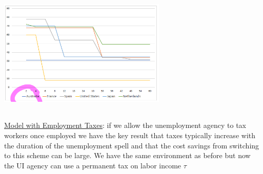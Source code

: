 \documentclass{article}
\begin{document}
\begin{itemize}
    \begin{center}
        \includegraphics[width=8cm, height=6cm]{pic27}
    \end{center}
\end{itemize}
\vspace{2.5mm}
\par \underline{Model with Employment Taxes}: if we allow the unemployment agency to tax workers once employed we have the key result that taxes typically increase with the duration of the unemployment spell and that the cost savings from switching to this scheme can be large. We have the same environment as before but now the UI agency can use a permanent tax on labor income $\tau$
\end{document}
